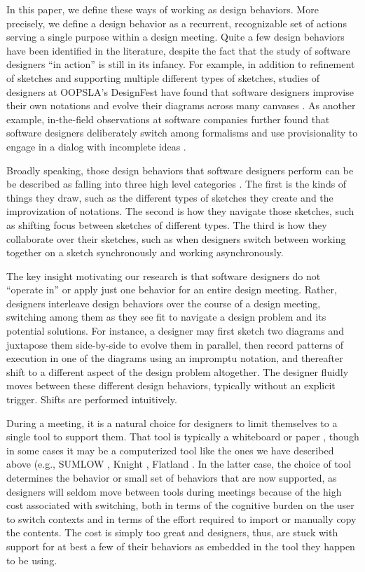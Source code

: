 In this paper, we define these ways of working as design behaviors. More precisely, we define a design behavior as a recurrent, recognizable set of actions serving a single purpose within a design meeting. Quite a few design behaviors have been identified in the literature, despite the fact that the study of software designers ``in action'' is still in its infancy. For example, in addition to refinement of sketches and supporting multiple different types of sketches, studies of designers at OOPSLA’s DesignFest have found that software designers improvise their own notations and evolve their diagrams across many canvases \cite{dekel2007notation}. As another example, in-the-field observations at software companies further found that software designers deliberately switch among formalisms and use provisionality to engage in a dialog with incomplete ideas \cite{petre2009insights}. 

Broadly speaking, those design behaviors that software designers perform can be be described as falling into three high level categories . The  first is the kinds of things they draw, such as the different types of sketches they create and the improvization of notations. The second is how they navigate those sketches, such as shifting focus between sketches of different types. The third is how they collaborate over their sketches, such as when designers switch between working together on a sketch synchronously and working asynchronously. 

The key insight motivating our research is that software designers do not ``operate in'' or apply just one behavior for an entire design meeting. Rather, designers interleave design behaviors over the course of a design meeting, switching among them as they see fit to navigate a design problem and its potential solutions. For instance, a designer may first sketch two diagrams and juxtapose them side-by-side to evolve them in parallel, then record patterns of execution in one of the diagrams using an impromptu notation, and thereafter shift to a different aspect of the design problem altogether. The designer fluidly moves between these different design behaviors, typically without an explicit trigger. Shifts are performed intuitively.

During a meeting, it is a natural choice for designers to limit themselves to a single tool to support them. That tool is typically a whiteboard or paper \cite{petre2009insights}, though in some cases it may be a computerized tool like the ones we have described above (e.g., SUMLOW \cite{chen2008sumlow}, Knight \cite{damm2000tool}, Flatland \cite{mynatt1999flatland}. In the latter case, the choice of tool determines the behavior or small set of behaviors that are now supported, as designers will seldom move between tools during meetings because of the high cost associated with switching, both in terms of the cognitive burden on the user to switch contexts and in terms of the effort required to import or manually copy the contents. The cost is simply too great and designers, thus, are stuck with support for at best a few of their behaviors as embedded in the tool they happen to be using.

